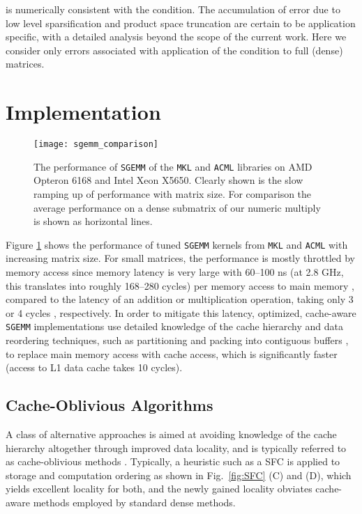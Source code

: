 is numerically consistent with the \SpAMM{} condition. The accumulation of
error due to low level sparsification and product space truncation are certain
to be application specific, with a detailed analysis beyond the scope of the
current work. Here we consider only errors associated with application of the
\SpAMM{} condition to full (dense) matrices.

\section{Implementation}
\label{sec:implementation}

\begin{figure}
\texttt{[image: sgemm\_comparison]}
\caption{\label{fig:sgemm_comparison} The performance of {\tt SGEMM} of the
{\tt MKL} and {\tt ACML} libraries on AMD Opteron 6168 and Intel Xeon X5650.
Clearly shown is the slow ramping up of performance with matrix size. For
comparison the average performance on a dense  submatrix of our
numeric multiply is shown as horizontal lines.}
\end{figure}

Figure \ref{fig:sgemm_comparison} shows the performance of tuned {\tt SGEMM}
kernels from {\tt MKL} \cite{intelMKL} and {\tt ACML} \cite{amdACML} with
increasing matrix size. For small matrices, the performance is mostly
throttled by memory access since memory latency is very large with 
60--100 ns (at 2.8 GHz, this translates into roughly 168--280 cycles) per
memory access to main memory \cite[Table 2]{IntelPerformance}, compared to the
latency of an addition or multiplication operation, taking only 3 or 4 cycles
\cite[Xeon X5650, Appendix C]{Intel2009}, respectively.  In order to mitigate
this latency, optimized, cache-aware {\tt SGEMM} implementations use detailed
knowledge of the cache hierarchy and data reordering techniques, such as
partitioning and packing into contiguous buffers \cite{Goto2002,
Goto:2008:AHM:1356052.1356053, Goto:2008:HIL:1377603.1377607,
gustavson2011parallel}, to replace main memory access with cache access, which
is significantly faster (access to L1 data cache takes  10 cycles).

\subsection{Cache-Oblivious Algorithms}

A class of alternative approaches is aimed at avoiding knowledge of the cache
hierarchy altogether through improved data locality, and is typically referred
to as cache-oblivious methods \cite{bader08hardware-oriented, Jin2005,
Wise:2001:LSM:568014.379559, Thiyagalingam03improvingthe,
Hanlon:2001:CCM:565761.565766, Adams:2006:SOS, Frigo:1999:CA:795665.796479,
OlsonSkov2002, Gottschling:2007:RMA:1274971.1274989,
Lorton:2006:ABL:1166133.1166134, Gabriel:2004:OCR:1054943.1054962,
mellor2001improving}. Typically, a heuristic such as a SFC is applied to
storage and computation ordering as shown in Fig.~\ref{fig:SFC} (C) and (D),
which yields excellent locality for both, and the newly gained locality
obviates cache-aware methods employed by standard dense methods.

